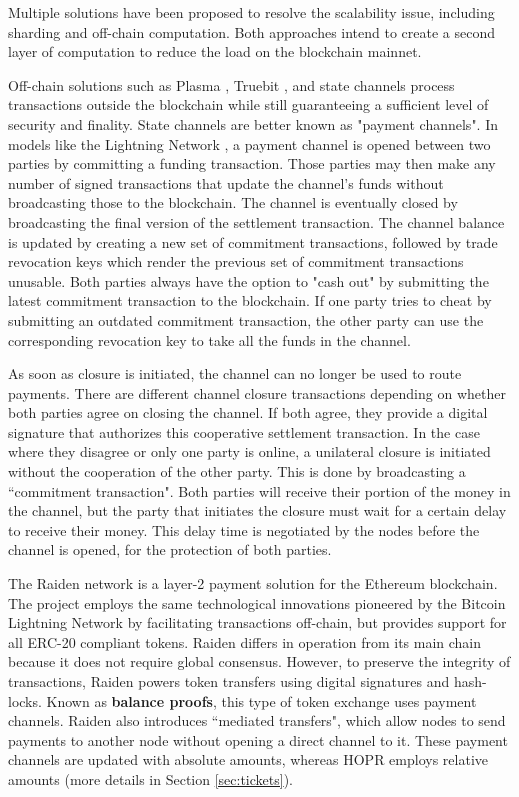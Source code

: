 Multiple solutions have been proposed to resolve the scalability issue, including sharding and off-chain computation. Both approaches intend to create a second layer of computation to reduce the load on the blockchain mainnet.

Off-chain solutions such as Plasma \cite{plasma}, Truebit \cite{truebit}, and state channels process transactions outside the blockchain while still guaranteeing a sufficient level of security and finality. State channels are better known as "payment channels". In models like the Lightning Network \cite{lightningnetwork}, a payment channel is opened between two parties by committing a funding transaction. Those parties may then make any number of signed transactions that update the channel's funds without broadcasting those to the blockchain. The channel is eventually closed by broadcasting the final version of the settlement transaction. The channel balance is updated by creating a new set of commitment transactions, followed by trade revocation keys which render the previous set of commitment transactions unusable. Both parties always have the option to "cash out" by submitting the latest commitment transaction to the blockchain. If one party tries to cheat by submitting an outdated commitment transaction, the other party can use the corresponding revocation key to take all the funds in the channel.

As soon as closure is initiated, the channel can no longer be used to route payments. There are different channel closure transactions depending on whether both parties agree on closing the channel. If both agree, they provide a digital signature that authorizes this cooperative settlement transaction. In the case where they disagree or only one party is online, a unilateral closure is initiated without the cooperation of the other party. This is done by broadcasting a ``commitment transaction". Both parties will receive their portion of the money in the channel, but the party that initiates the closure must wait for a certain delay to receive their money. This delay time is negotiated by the nodes before the channel is opened, for the protection of both parties.

The Raiden network \cite{raiden} is a layer-2 payment solution for the Ethereum blockchain. The project employs the same technological innovations pioneered by the Bitcoin Lightning Network by facilitating transactions off-chain, but provides support for all ERC-20 compliant tokens. Raiden differs in operation from its main chain because it does not require global consensus. However, to preserve the integrity of transactions, Raiden powers token transfers using digital signatures and hash-locks. Known as \textbf{balance proofs}, this type of token exchange uses payment channels. Raiden also introduces ``mediated transfers", which allow nodes to send payments to another node without opening a direct channel to it. These payment channels are updated with absolute amounts, whereas HOPR employs relative amounts (more details in Section \ref{sec:tickets}).

